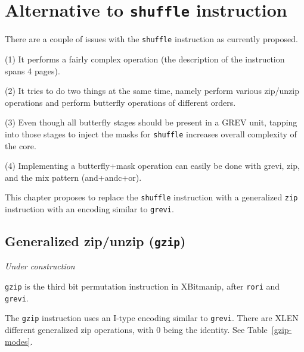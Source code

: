 \chapter{Alternative to \texttt{shuffle} instruction}

There are a couple of issues with the {\tt shuffle} instruction as currently proposed.

(1) It performs a fairly complex operation (the description of the instruction
spans 4 pages).

(2) It tries to do two things at the same time, namely perform various zip/unzip
operations and perform butterfly operations of different orders.

(3) Even though all butterfly stages should be present in a GREV unit, tapping into
those stages to inject the masks for {\tt shuffle} increases overall complexity of
the core.

(4) Implementing a butterfly+mask operation can easily be done with grevi, zip,
and the mix pattern (and+andc+or).

This chapter proposes to replace the {\tt shuffle} instruction with a generalized
{\tt zip} instruction with an encoding similar to {\tt grevi}.


\section{Generalized zip/unzip (\texttt{gzip})}

{\it Under construction}

{\tt gzip} is the third bit permutation instruction in XBitmanip, after {\tt rori}
and {\tt grevi}.

The {\tt gzip} instruction uses an I-type encoding similar to {\tt grevi}. There
are XLEN different generalized zip operations, with 0 being the identity. See
Table~\ref{gzip-modes}.

